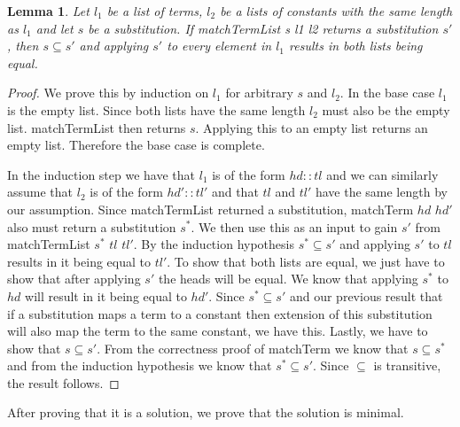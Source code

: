 \documentclass{article}
\newtheorem{lemma}{Lemma}
\begin{document}
        \begin{lemma}
            Let $l_1$ be a list of terms, $l_2$ be a lists of constants with the same length as $l_1$ and let $s$ be a substitution. If matchTermList s l1 l2 returns a substitution $s'$, then $s \subseteq s'$ and applying $s'$ to every element in $l_1$ results in both lists being equal.
        \end{lemma}
        \begin{proof}
            We prove this by induction on $l_1$ for arbitrary $s$ and $l_2$.
            In the base case $l_1$ is the empty list. Since both lists have the same length $l_2$ must also be the empty list. matchTermList then returns $s$. Applying this to an empty list returns an empty list. Therefore the base case is complete.

            In the induction step we have that $l_1$ is of the form $hd::tl$ and we can similarly assume that $l_2$ is of the form $hd'::tl'$ and that $tl$ and $tl'$ have the same length by our assumption. Since matchTermList returned a substitution, matchTerm $hd$ $hd'$ also must return a substitution $s^\ast$.
            We then use this as an input to gain $s'$ from matchTermList $s^\ast$ $tl$ $tl'$. By the induction hypothesis $s^\ast \subseteq s'$ and applying $s'$ to $tl$ results in it being equal to $tl'$. To show that both lists are equal, we just have to show that after applying $s'$ the heads will be equal. We know that applying $s^\ast$ to $hd$ will result in it being equal to $hd'$. Since $s^\ast \subseteq s'$ and our previous result that if a substitution maps a term to a constant then extension of this substitution will also map the term to the same constant, we have this.
            Lastly, we have to show that $s \subseteq s'$. From the correctness proof of matchTerm we know that $s \subseteq s^\ast$ and from the induction hypothesis we know that $s^\ast \subseteq s'$. Since $\subseteq$ is transitive, the result follows.
        \end{proof}

        After proving that it is a solution, we prove that the solution is minimal.
\end{document}
